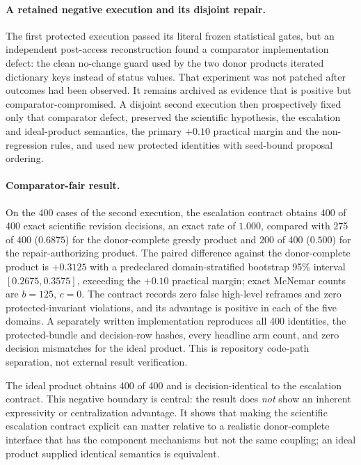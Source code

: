 \paragraph{A retained negative execution and its disjoint repair.}
The first protected execution passed its literal frozen statistical gates, but
an independent post-access reconstruction found a comparator implementation
defect: the clean no-change guard used by the two donor products iterated
dictionary keys instead of status values. That experiment was not patched after
outcomes had been observed. It remains archived as evidence that is positive but
comparator-compromised. A disjoint second execution then prospectively fixed only
that comparator defect, preserved the scientific hypothesis, the escalation and
ideal-product semantics, the primary $+0.10$ practical margin and the
non-regression rules, and used new protected identities with seed-bound proposal
ordering.

\paragraph{Comparator-fair result.}
On the 400 cases of the second execution, the escalation contract obtains 400 of
400 exact scientific revision decisions, an exact rate of $1.000$, compared with
275 of 400 ($0.6875$) for
the donor-complete greedy product and 200 of 400 ($0.500$) for the
repair-authorizing product. The paired difference against the donor-complete
product is $+0.3125$ with a predeclared domain-stratified bootstrap 95\%
interval $[0.2675,0.3575]$, exceeding the $+0.10$ practical margin; exact
McNemar counts are $b=125$, $c=0$. The contract records zero false high-level
reframes and zero protected-invariant violations, and its advantage is positive
in each of the five domains. A separately written implementation reproduces all 400
identities, the protected-bundle and decision-row hashes, every headline arm
count, and zero decision mismatches for the ideal product. This is repository
code-path separation, not external result verification.

The ideal product obtains 400 of 400 and is decision-identical to the escalation
contract. This negative boundary is central: the result does \emph{not} show an
inherent expressivity or centralization advantage. It shows that making the
scientific escalation contract explicit can matter relative to a realistic
donor-complete interface that has the component mechanisms but not the same
coupling; an ideal product supplied identical semantics is equivalent.

